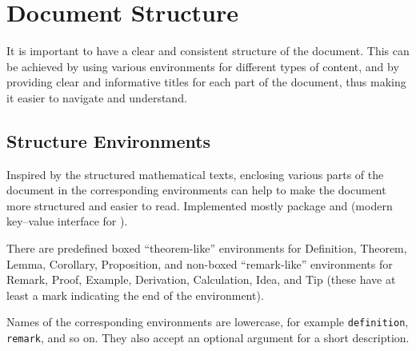 \section{Document Structure}%
\label{sec:Document Structure}

It is important to have a clear and consistent structure of the document.
This can be achieved by using various environments for different types of content, and by providing clear and informative titles for each part of the document, thus making it easier to navigate and understand.

\subsection{Structure Environments}%
\label{sub:Structure Environments}

Inspired by the structured mathematical texts, enclosing various parts of the document in the corresponding environments can help to make the document more structured and easier to read.
Implemented mostly  package and  (modern key--value interface for ).

\begin{remark}
    There are predefined boxed \enquote{theorem-like} environments for \textsf{Definition}, \textsf{Theorem}, \textsf{Lemma}, \textsf{Corollary}, \textsf{Proposition}, and non-boxed \enquote{remark-like} environments for \textsf{Remark}, \textsf{Proof}, \textsf{Example}, \textsf{Derivation}, \textsf{Calculation}, \textsf{Idea}, and \textsf{Tip} (these have at least a mark indicating the end of the environment).

    Names of the corresponding environments are lowercase, for example \texttt{definition}, \texttt{remark}, and so on.
    They also accept an optional argument for a short description.
\end{remark}

